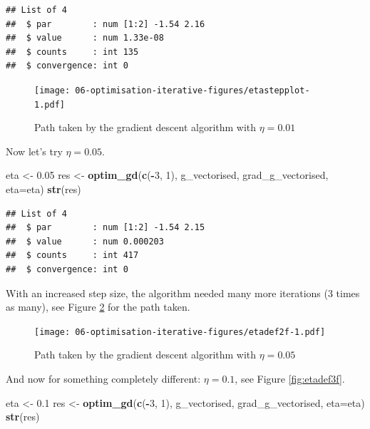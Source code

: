 \documentclass[10pt,b5paper,krantz1]{krantz}
\newenvironment{Shaded}{\begin{snugshade}}{\end{snugshade}}
\newcommand{\DataTypeTok}[1]{\textcolor[rgb]{0.27,0.27,0.27}{#1}}
\newcommand{\DecValTok}[1]{\textcolor[rgb]{0.06,0.06,0.06}{#1}}
\newcommand{\FloatTok}[1]{\textcolor[rgb]{0.06,0.06,0.06}{#1}}
\newcommand{\KeywordTok}[1]{\textcolor[rgb]{0.27,0.27,0.27}{\textbf{#1}}}
\newcommand{\NormalTok}[1]{#1}
\newcommand{\OperatorTok}[1]{\textcolor[rgb]{0.43,0.43,0.43}{\textbf{#1}}}
\newcommand{\StringTok}[1]{\textcolor[rgb]{0.5,0.5,0.5}{#1}}
\begin{document}
\begin{verbatim}
## List of 4
##  $ par        : num [1:2] -1.54 2.16
##  $ value      : num 1.33e-08
##  $ counts     : int 135
##  $ convergence: int 0
\end{verbatim}

\begin{figure}
\hypertarget{fig:etastepplot}{%
\centering
\texttt{[image: 06-optimisation-iterative-figures/etastepplot-1.pdf]}
\caption{Path taken by the gradient descent algorithm with \(\eta=0.01\)}\label{fig:etastepplot}
}
\end{figure}

Now let's try \(\eta=0.05\).

\begin{Shaded}
\begin{Highlighting}[]
\NormalTok{eta <-}\StringTok{ }\FloatTok{0.05}
\NormalTok{res <-}\StringTok{ }\KeywordTok{optim_gd}\NormalTok{(}\KeywordTok{c}\NormalTok{(}\OperatorTok{-}\DecValTok{3}\NormalTok{, }\DecValTok{1}\NormalTok{), g_vectorised, grad_g_vectorised, }\DataTypeTok{eta=}\NormalTok{eta)}
\KeywordTok{str}\NormalTok{(res)}
\end{Highlighting}
\end{Shaded}

\begin{verbatim}
## List of 4
##  $ par        : num [1:2] -1.54 2.15
##  $ value      : num 0.000203
##  $ counts     : int 417
##  $ convergence: int 0
\end{verbatim}

With an increased step size, the algorithm needed
many more iterations (3 times as many),
see Figure \ref{fig:etadef2f} for the path taken.

\begin{figure}
\hypertarget{fig:etadef2f}{%
\centering
\texttt{[image: 06-optimisation-iterative-figures/etadef2f-1.pdf]}
\caption{Path taken by the gradient descent algorithm with \(\eta=0.05\)}\label{fig:etadef2f}
}
\end{figure}

And now for something completely different: \(\eta=0.1\), see Figure \ref{fig:etadef3f}.

\begin{Shaded}
\begin{Highlighting}[]
\NormalTok{eta <-}\StringTok{ }\FloatTok{0.1}
\NormalTok{res <-}\StringTok{ }\KeywordTok{optim_gd}\NormalTok{(}\KeywordTok{c}\NormalTok{(}\OperatorTok{-}\DecValTok{3}\NormalTok{, }\DecValTok{1}\NormalTok{), g_vectorised, grad_g_vectorised, }\DataTypeTok{eta=}\NormalTok{eta)}
\KeywordTok{str}\NormalTok{(res)}
\end{Highlighting}
\end{Shaded}
\end{document}
